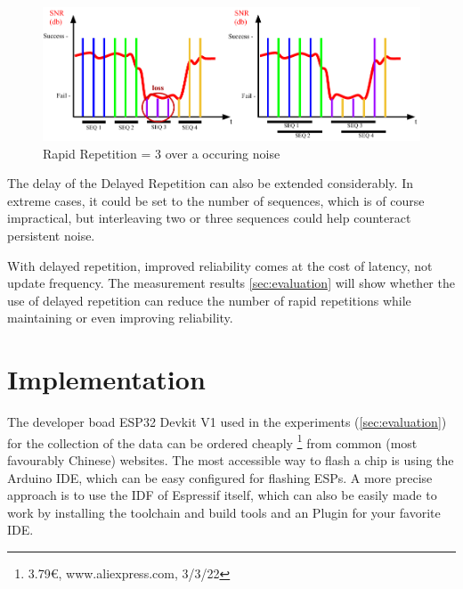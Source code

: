 \begin{figure}[h]
	\includegraphics[scale=0.75]{figures/BadChannel.pdf}
	\caption{Rapid Repetition = 3 over a occuring noise}
	\label{fig:badChannel}
\end{figure}

The delay of the Delayed Repetition can also be extended considerably.
In extreme cases, it could be set to the number of sequences, which is of course impractical,
but interleaving two or three sequences could help counteract persistent noise.

With delayed repetition, improved reliability comes at the cost of latency, not update frequency.
The measurement results \cref{sec:evaluation} will show whether the use of delayed repetition can reduce the number of rapid repetitions 
while maintaining or even improving reliability.


\section{Implementation}

The developer boad ESP32 Devkit V1 used in the experiments (\cref{sec:evaluation}) for the collection of the data
can be ordered cheaply 
\footnote{3.79€, www.aliexpress.com, 3/3/22}
from common (most favourably Chinese) websites. 
The most accessible way to flash a chip is using the Arduino IDE, which can be easy configured for flashing ESPs.
A more precise approach is to use the IDF of Espressif itself, 
which can also be easily made to work by installing the toolchain and build tools and an Plugin for your favorite IDE.

